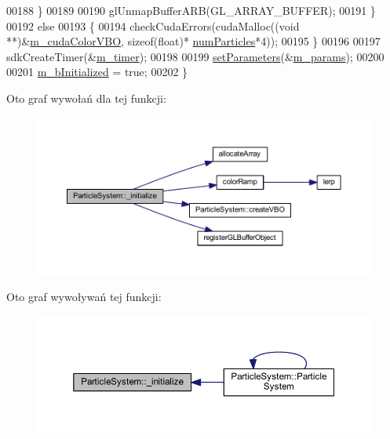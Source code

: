 \begin{DoxyCode}
00188         \}
00189 
00190         glUnmapBufferARB(GL\_ARRAY\_BUFFER);
00191     \}
00192     \textcolor{keywordflow}{else}
00193     \{
00194         checkCudaErrors(cudaMalloc((\textcolor{keywordtype}{void} **)&\hyperlink{class_particle_system_a39d210b57da5f7f4a2c23f4fc0b43ea1}{m\_cudaColorVBO}, \textcolor{keyword}{sizeof}(\textcolor{keywordtype}{float})*
      \hyperlink{particles_8cpp_a05b8a90212054a3eb1a036ae0c269596}{numParticles}*4));
00195     \}
00196 
00197     sdkCreateTimer(&\hyperlink{class_particle_system_af01e546384ef27bb1894a37f2a02e967}{m\_timer});
00198 
00199     \hyperlink{particle_system_8cuh_a342176dbaba2668312c45e1a1423fc4e}{setParameters}(&\hyperlink{class_particle_system_ab765472aed6a1b5f0d2f98a3a906c417}{m\_params});
00200 
00201     \hyperlink{class_particle_system_a21bbfba9d8701a70bc6fddbf4fc3f5bd}{m\_bInitialized} = \textcolor{keyword}{true};
00202 \}
\end{DoxyCode}


Oto graf wywołań dla tej funkcji\-:\nopagebreak
\begin{figure}[H]
\begin{center}
\leavevmode
\includegraphics[width=350pt]{class_particle_system_a484988642e046424d32a13709204e8de_cgraph}
\end{center}
\end{figure}




Oto graf wywoływań tej funkcji\-:\nopagebreak
\begin{figure}[H]
\begin{center}
\leavevmode
\includegraphics[width=350pt]{class_particle_system_a484988642e046424d32a13709204e8de_icgraph}
\end{center}
\end{figure}


